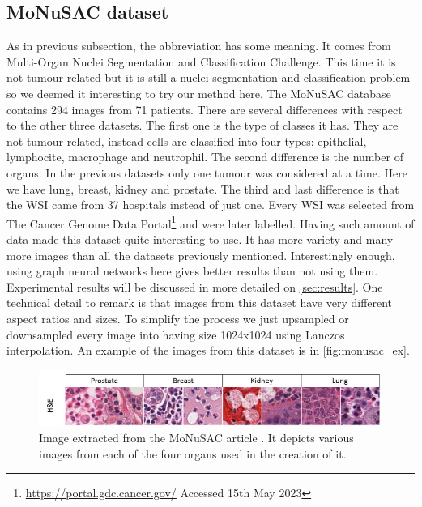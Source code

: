\subsection{MoNuSAC dataset}\label{sec:data_monusac}

As in previous subsection, the abbreviation has some meaning. It comes from Multi-Organ Nuclei Segmentation and Classification Challenge. This time it is not tumour related but it is still a nuclei segmentation and classification problem so we deemed it interesting to try our method here. The MoNuSAC database contains 294 images from 71 patients. There are several differences with respect to the other three datasets. The first one is the type of classes it has. They are not tumour related, instead cells are classified into four types: epithelial, lymphocite, macrophage and neutrophil. The second difference is the number of organs. In the previous datasets only one tumour was considered at a time. Here we have lung, breast, kidney and prostate. The third and last difference is that the WSI came from 37 hospitals instead of just one. Every WSI was selected from The Cancer Genome Data Portal\footnote{\url{https://portal.gdc.cancer.gov/} Accessed 15th May 2023} and were later labelled. Having such amount of data made this dataset quite interesting to use. It has more variety and many more images than all the datasets previously mentioned. Interestingly enough, using graph neural networks here gives better results than not using them. Experimental results will be discussed in more detailed on \autoref{sec:results}. One technical detail to remark is that images from this dataset have very different aspect ratios and sizes. To simplify the process we just upsampled or downsampled every image into having size 1024x1024 using Lanczos interpolation. An example of the images from this dataset is in \autoref{fig:monusac_ex}.

\begin{figure}[H]
    \centering
    \includegraphics[width=\textwidth]{imgs/data/monusac.png}
    \caption{Image extracted from the MoNuSAC article \cite{8880654}. It depicts various images from each of the four organs used in the creation of it.}
    \label{fig:monusac_ex}
\end{figure}

